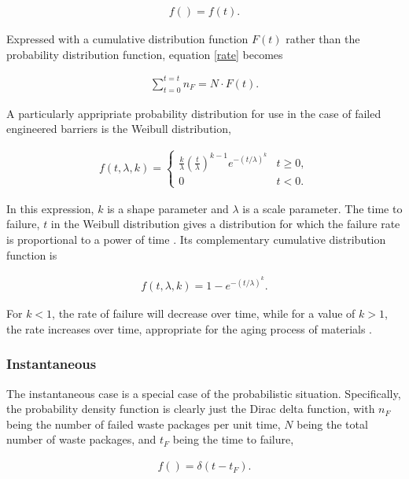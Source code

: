 \begin{align}
  f()=f(t).
  \label{probabilistic}
\end{align}

Expressed with a cumulative distribution function $F(t)$ rather than the
probability distribution function, equation \eqref{rate} becomes 


\begin{align}
  \sum_{t=0}^{t=t}n_F=N\cdot F(t).
  \label{cdf}
\end{align}


A particularly appripriate probability distribution for use in the case of failed 
engineered barriers is the Weibull distribution, 

\begin{align}
  f(t,\lambda,k) =  \begin{cases}
    \frac{k}{\lambda}\left(\frac{t}{\lambda}\right)^{k-1}e^{-(t/\lambda)^{k}} & 
    t\geq0 ,\\
    0 & t<0 .\end{cases}
  \label{weibullpdf}
\end{align}


In this expression, $k$ is a shape parameter and $\lambda$ is a scale
parameter. The time to failure, $t$ in the Weibull distribution gives a 
distribution for which the failure rate is proportional to a power of time 
\cite{papoulis_probability_2002}. Its complementary cumulative distribution
function is 

\begin{align}
  f(t,\lambda,k) = 1-e^{-(t/\lambda)^k}.
  \label{weibullcdf}
\end{align}

For $k<1$, the rate of failure will decrease over time, while for a value of 
$k>1$, the rate increases over time, appropriate for the aging process of 
materials  \cite{papoulis_probability_2002}.


\subsubsection{Instantaneous}

The instantaneous case is a special case of the probabilistic situation.
Specifically, the probability density function is clearly just the Dirac 
delta function, with $n_F$ being the number of failed waste packages per 
unit time, $N$ being the total number of waste packages, and $t_F$ being 
the time to failure,

\begin{align}
  f()= \delta(t-t_F).
  \label{instantaneous}
\end{align}


